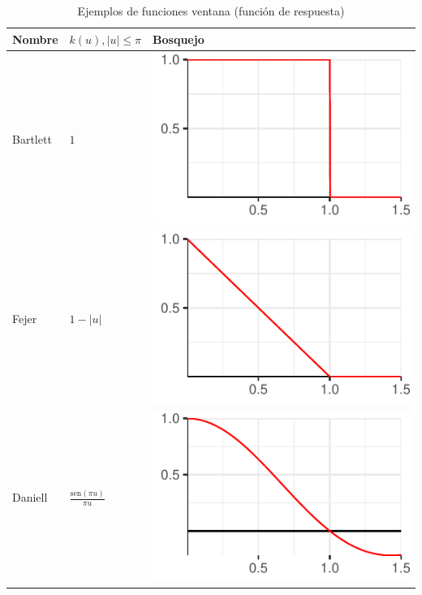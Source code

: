 \documentclass[12pt,letterpaper]{book}
\newcommand{\SEN}[1]{\mathrm{sen}\left( #1 \right)}
\newcommand{\abso}[1]{\left| #1 \right|}
\begin{document}
\begin{table}
\label{ventanas}
\caption{Ejemplos de funciones ventana (función de respuesta)}
\centering
\begin{small}
\begin{tabular}{lll}
\toprule
Nombre & $k(u), \abso{u} \leq \pi$ & Bosquejo \\
\midrule
Bartlett &
$\displaystyle 
1 
$
& \includegraphics[scale=.4]{./img_ventanas/ventana_bartlett.pdf}\\
\rowcolor{gris}
Fejer &
$\displaystyle 
1-\abso{u}
$
& \includegraphics[scale=.4]{./img_ventanas/ventana_fejer.pdf} \\
Daniell &
$\displaystyle 
\frac{\SEN{\pi u}}{\pi u}
$
& \includegraphics[scale=.4]{./img_ventanas/ventana_daniell.pdf} \\

\end{tabular}
\end{small}
\end{table}
\end{document}
